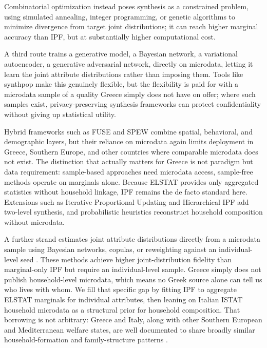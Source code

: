 \documentclass{article}
\begin{document}
Combinatorial optimization instead poses synthesis as a constrained problem, using simulated annealing, integer programming, or genetic algorithms to minimize divergence from target joint distributions; it can reach higher marginal accuracy than IPF, but at substantially higher computational cost.

A third route trains a generative model, a Bayesian network, a variational autoencoder, a generative adversarial network, directly on microdata, letting it learn the joint attribute distributions rather than imposing them. Tools like synthpop \citep{nowok2016synthpop} make this genuinely flexible, but the flexibility is paid for with a microdata sample of a quality Greece simply does not have on offer; where such samples exist, privacy-preserving synthesis frameworks \citep{SanchezSerrano2025DP} can protect confidentiality without giving up statistical utility.

Hybrid frameworks such as FUSE and SPEW \citep{wheaton2019spew} combine spatial, behavioral, and demographic layers, but their reliance on microdata again limits deployment in Greece, Southern Europe, and other countries where comparable microdata does not exist. The distinction that actually matters for Greece is not paradigm but data requirement: sample-based approaches need microdata access, sample-free methods operate on marginals alone. Because ELSTAT provides only aggregated statistics without household linkage, IPF remains the de facto standard here. Extensions such as Iterative Proportional Updating \citep{Aemmer2022IPU} and Hierarchical IPF \citep{Muller2011HIPF} add two-level synthesis, and probabilistic heuristics \citep{lenormand2013generating} reconstruct household composition without microdata.

A further strand estimates joint attribute distributions directly from a microdata sample using Bayesian networks, copulas, or reweighting against an individual-level seed \citep{DURANHERAS201878, Aemmer2022IPU}. These methods achieve higher joint-distribution fidelity than marginal-only IPF but require an individual-level sample. Greece simply does not publish household-level microdata, which means no Greek source alone can tell us who lives with whom. We fill that specific gap by fitting IPF to aggregate ELSTAT marginals for individual attributes, then leaning on Italian ISTAT household microdata as a structural prior for household composition. That borrowing is not arbitrary: Greece and Italy, along with other Southern European and Mediterranean welfare states, are well documented to share broadly similar household-formation and family-structure patterns \citep{Reher1998, Naldini2003, Iacovou2011HouseholdEU}.
\end{document}
